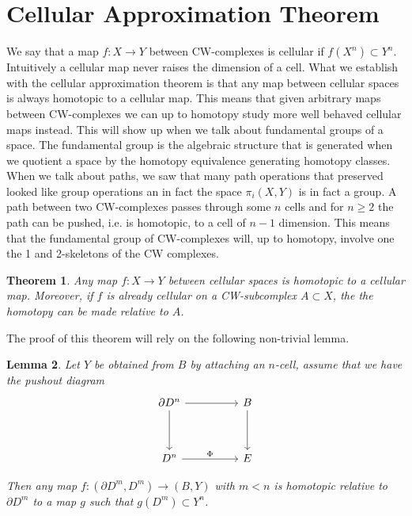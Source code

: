 \documentclass[40pt]{article}
\newtheorem{theorem}{Theorem}[section]
\newtheorem{lemma}[theorem]{Lemma}
\begin{document}
		\section{Cellular Approximation Theorem}
		We say that a map $f:X \rightarrow Y$ between CW-complexes is cellular if $f(X^n) \subset Y^n$. Intuitively a cellular map never raises the dimension of a cell. What we establish with the cellular approximation theorem is that any map between cellular spaces is always homotopic to a cellular map. This means that given arbitrary maps between CW-complexes we can up to homotopy study more well behaved cellular maps instead. This will show up when we talk about fundamental groups of a space. The fundamental group is the algebraic structure that is generated when we quotient a space by the homotopy equivalence generating homotopy classes. When we talk about paths, we saw that many path operations that preserved looked like group operations an in fact the space $\pi_i(X, Y)$ is in fact a group. A path between two CW-complexes passes through some $n$ cells and for $n \geq 2$ the path can be pushed, i.e. is homotopic, to a cell of $n-1$ dimension. This means that the fundamental group of CW-complexes will, up to homotopy, involve one the 1 and 2-skeletons of the CW complexes. 
		\begin{theorem}
			Any map $f:X \rightarrow Y$ between cellular spaces is homotopic to a cellular map. Moreover, if $f$ is already cellular on a CW-subcomplex $A \subset X$, the the homotopy can be made relative to $A$. 
		\end{theorem}
		The proof of this theorem will rely on the following non-trivial lemma. 
		\begin{lemma}
			Let $Y$ be obtained from $B$ by attaching an $n$-cell, assume that we have the pushout diagram 
			\[\begin{tikzcd}
				{\partial D^n} && B \\
				\\
				{D^n} && E
				\arrow[from=1-1, to=1-3]
				\arrow[from=1-1, to=3-1]
				\arrow[from=1-3, to=3-3]
				\arrow["\Phi", from=3-1, to=3-3]
			\end{tikzcd}\]
			
			Then any map $f: (\partial D^m, D^m) \rightarrow (B,Y)$ with $m < n$ is homotopic relative to $\partial D^m$ to a map $g$ such that $g(D^m) \subset Y^n$. 
		\end{lemma}
\end{document}
